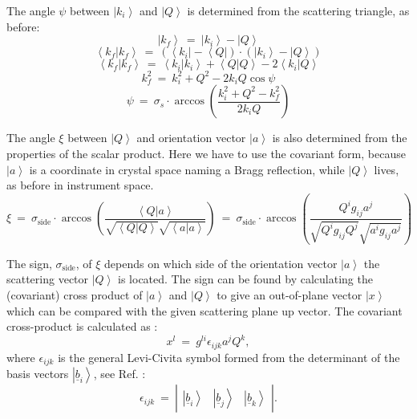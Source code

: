 The angle $\psi$ between $\left| k_i \right>$ and $\left| Q \right>$ is determined from the scattering triangle, as before:
\begin{equation}
	\left| k_f \right> \ =\  \left| k_i \right> - \left| Q \right> 
\end{equation}
\begin{equation} 
	\left< k_f | k_f \right> \ =\  \left( \left< k_i \right| - \left< Q \right| \right) \cdot \left( \left| k_i \right> - \left| Q \right> \right)
\end{equation}
\begin{equation}
	\left< k_f | k_f \right> \ =\  \left< k_i | k_i \right> + \left< Q | Q \right> - 2 \left< k_i | Q \right>
\end{equation}
\begin{equation}
	k_f^2 \ =\  k_i^2 + Q^2 - 2 k_i Q \cos \psi 
\end{equation}
\begin{equation}
	\boxed{ \psi \ =\  \sigma_s \cdot \arccos \left( \frac{k_i^2 + Q^2 - k_f^2}{2 k_i Q} \right) }
\end{equation}


\vspace{0.5cm}


The angle $\xi$ between $\left| Q \right>$ and orientation vector $\left| a \right>$ is also determined 
from the properties of the scalar product.
Here we have to use the covariant form, because $\left| a \right>$ is a coordinate in crystal space 
naming a Bragg reflection, while $\left| Q \right>$ lives, as before in instrument space.
\begin{equation} 
	\boxed{ \xi \ =\  
\sigma_{\mathrm{side}} \cdot \arccos \left( \frac{ \left< Q | a \right> }{ \sqrt{\left< Q | Q \right>} \sqrt{\left< a | a \right>} } \right) \ =\  
\sigma_{\mathrm{side}} \cdot \arccos \left( \frac{ Q^i g_{ij} a^j }{ \sqrt{Q^i g_{ij} Q^j} \sqrt{a^i g_{ij} a^j} } \right) } 
\label{eq:xi}
\end{equation}

The sign, $\sigma_{\mathrm{side}}$, of $\xi$ depends on which side of the orientation vector 
$\left| a \right>$ the scattering vector $\left| Q \right>$ is located. 
The sign can be found by calculating the (covariant) cross product of $\left| a \right>$ and 
$\left| Q \right>$ to give an out-of-plane vector $\left| x \right>$ which can be compared with 
the given scattering plane up vector.
The covariant cross-product is calculated as \cite[p. 815]{Arens2015}:
\begin{equation}
	x^l \ =\  g^{li} \epsilon_{ijk} a^j Q^k,
\end{equation}
where $\epsilon_{ijk}$ is the general Levi-Civita symbol formed from the determinant of the 
basis vectors $\left| \underline{b}_i \right>$, see Ref. \cite[p. 815]{Arens2015}:
\begin{equation}
	\epsilon_{ijk} \ =\  \left|
		\begin{array}{ccc} \left| 
			\underline{b}_i \right> & \left| \underline{b}_j \right> & \left| \underline{b}_k \right>
		\end{array} \right|.
\end{equation}



